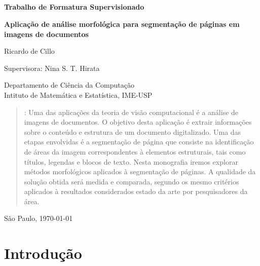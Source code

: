 \documentclass[a4paper,11pt]{article}
\begin{document}


\thispagestyle{empty}
\

\

\

\

\begin{center}
{\bf \Large Trabalho de Formatura Supervisionado}

\bigskip
\bigskip
{\bf \LARGE Aplicação de análise morfológica para segmentação de páginas em imagens de documentos}

\bigskip
{\large Ricardo de Cillo}

\bigskip
Supervisora: Nina S. T. Hirata 

\bigskip
Departamento de Ciência da Computação\\
Intituto de Matemática e Estatística, IME-USP
\end{center}


\bigskip
\begin{quote}
\begin{spacing}{1.2}
: Uma das aplicações da teoria de visão computacional é a análise de imagens de documentos. O objetivo desta aplicação é extrair informações sobre o conteúdo e estrutura de um documento digitalizado. Uma das etapas envolvidas é a segmentação de página que consiste na identificação de áreas da imagem correspondentes à elementos estruturais, tais como títulos, legendas e blocos de texto. Nesta monografia iremos explorar métodos morfológicos aplicados à segmentação de páginas. A qualidade da solução obtida será medida e comparada, segundo os mesmo critérios aplicados à resultados considerados estado da arte por pesquisadores da área.
\end{spacing} 
\end{quote}

\bigskip
\begin{center}
São Paulo, \today
\end{center}



\newpage
\setcounter{page}{1}



\section{Introdução}
\end{document}
